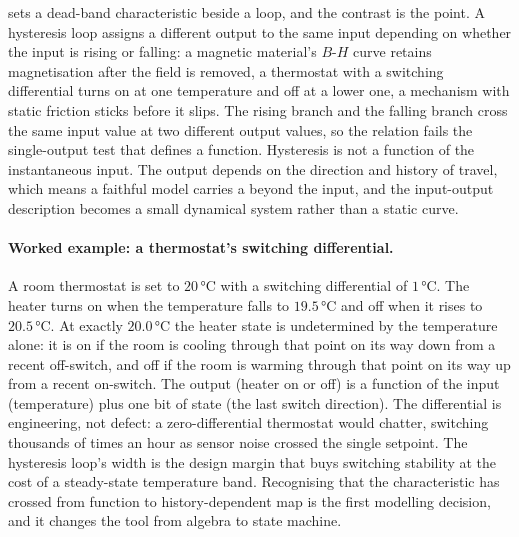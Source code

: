 

 sets a dead-band
characteristic beside a  loop, and the contrast
is the point. A hysteresis loop assigns a different output to the
same input depending on whether the input is rising or falling: a
magnetic material's $B$-$H$ curve retains magnetisation after the
field is removed, a thermostat with a switching differential turns on
at one temperature and off at a lower one, a mechanism with static
friction sticks before it slips. The rising branch and the falling
branch cross the same input value at two different output values, so
the relation fails the single-output test that defines a function.
Hysteresis is not a function of the instantaneous input. The output
depends on the direction and history of travel, which means a faithful
model carries a  beyond the input, and the
input-output description becomes a small dynamical system rather than
a static curve.

\paragraph{Worked example: a thermostat's switching differential.}
A room thermostat is set to $20\,\si{\degreeCelsius}$ with a
switching differential of $1\,\si{\degreeCelsius}$. The heater turns
on when the temperature falls to $19.5\,\si{\degreeCelsius}$ and off
when it rises to $20.5\,\si{\degreeCelsius}$. At exactly
$20.0\,\si{\degreeCelsius}$ the heater state is undetermined by the
temperature alone: it is on if the room is cooling through that point
on its way down from a recent off-switch, and off if the room is
warming through that point on its way up from a recent on-switch. The
output (heater on or off) is a function of the input (temperature)
plus one bit of state (the last switch direction). The differential
is engineering, not defect: a zero-differential thermostat would
chatter, switching thousands of times an hour as sensor noise crossed
the single setpoint. The hysteresis loop's width is the design margin
that buys switching stability at the cost of a steady-state
temperature band. Recognising that the characteristic has crossed
from function to history-dependent map is the first modelling
decision, and it changes the tool from algebra to state machine.

